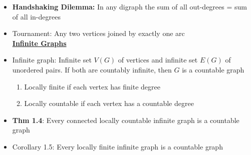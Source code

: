 \documentclass[10pt,landscape]{article}
\begin{document}
\begin{multicols}{2}
\begin{itemize}
    \item \textbf{Handshaking Dilemma:} In any digraph the sum of all out-degrees = sum of all in-degrees
    \item Tournament: Any two vertices joined by exactly one arc\\
    \medskip
    \underline{\textbf{Infinite Graphs}}
    \item Infinite graph: Infinite set $V(G)$ of vertices and infinite set $E(G)$ of unordered pairs. If both are countably infinite, then $G$ is a countable graph
    \begin{enumerate}
        \item Locally finite if each vertex has finite degree
        \item Locally countable if each vertex has a countable degree
    \end{enumerate}
    \item \textbf{Thm 1.4}: Every connected locally countable infinite graph is a countable graph
    \item Corollary 1.5: Every locally finite infinite graph is a countable graph
\end{itemize}


\end{multicols}
\end{document}

